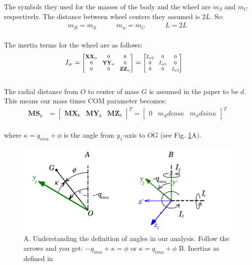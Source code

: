 \documentclass[a4paper,10pt]{article}
\newcommand\scalemath[2]{\scalebox{#1}{\mbox{\ensuremath{\displaystyle #2}}}}
\begin{document}
The symbols they used for the masses of the body and the wheel are $m_S$ and $m_C$ respectively. The distance between wheel centers
they assumed is $2L$. So:
\begin{align}
 m_B = m_S \hspace{35pt} m_w = m_C \hspace{35pt} L=2L \label{subsStart}
\end{align}
\\
The inertia terms for the wheel are as follows:
\begin{align}
 I_w &= \scalemath{0.75}{\left[\begin{matrix} \mathbf{XX}_w & 0 & 0 \\  
 0 & \mathbf{YY}_w & 0 \\ 
 0 & 0 & \mathbf{ZZ}_w \end{matrix}\right]}
 = \scalemath{0.75}{\left[\begin{matrix} I_{w2} & 0 & 0 \\  
 0 & I_{w3} & 0 \\ 
 0 & 0 & I_{w2} \end{matrix}\right]}
\end{align}
\\
The radial distance from 
$O$ to center of mass $G$ is assumed in the paper to be $d$. This means our mass times COM parameter becomes:
\begin{align}
 \mathbf{MS}_b &= \left[\begin{matrix} \mathbf{MX}_b & \mathbf{MY}_b & \mathbf{MZ}_b \end{matrix}\right]^T = \left[\begin{matrix} 0 & m_Sdcos\kappa & m_Sdsin\kappa \end{matrix}\right]^T  
\end{align} \\ where $\kappa = q_{imu} + \phi$ is the angle from $y_1$-axis to $\overline{OG}$ (see Fig. \ref{fig:kimAnglesInertias}A).
\begin{figure}[ht]
 \centering
 \includegraphics[width=\textwidth]{Figures/angles.png}
 \caption{A. Understanding the definition of angles in our analysis. Follow the arrows and you get: $-q_{imu}+\kappa=\phi$ or $\kappa=q_{imu}+\phi$
 \hspace{20pt}B. Inertias as defined in \cite{kim2005dynamic}}
 \label{fig:kimAnglesInertias}
\end{figure}
\end{document}
